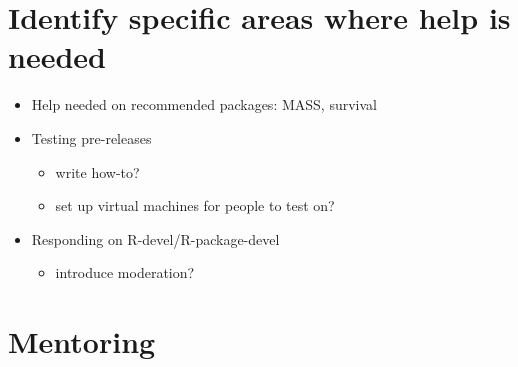 \documentclass[]{book}
\providecommand{\tightlist}{%
  \setlength{\itemsep}{0pt}\setlength{\parskip}{0pt}}
\begin{document}
\hypertarget{identify-specific-areas-where-help-is-needed}{%
\chapter{Identify specific areas where help is needed}\label{identify-specific-areas-where-help-is-needed}}

\begin{itemize}
\tightlist
\item
  Help needed on recommended packages: MASS, survival
\item
  Testing pre-releases

  \begin{itemize}
  \tightlist
  \item
    write how-to?
  \item
    set up virtual machines for people to test on?
  \end{itemize}
\item
  Responding on R-devel/R-package-devel

  \begin{itemize}
  \tightlist
  \item
    introduce moderation?
  \end{itemize}
\end{itemize}

\hypertarget{mentoring}{%
\chapter{Mentoring}\label{mentoring}}
\end{document}

